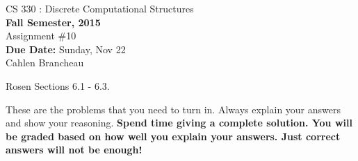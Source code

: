 \documentclass[11pt]{article}
\begin{document}
\begin{center}
{{\large CS 330 : Discrete Computational Structures}}\\


{\bf Fall Semester, 2015}\\

{\sc Assignment \#10}\\
{\bf Due Date:}  Sunday, Nov 22\\
Cahlen Brancheau
\end{center}

 Rosen Sections 6.1 - 6.3.

These are the problems that you need to turn in. Always explain your answers and show your reasoning. 
{\bf Spend time giving a complete solution. You will be graded based on how well you explain your answers. 
Just correct answers will not be enough!}

\end{document}
